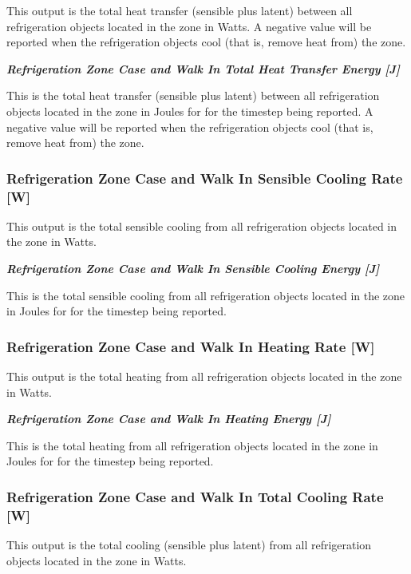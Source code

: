 This output is the total heat transfer (sensible plus latent) between all refrigeration objects located in the zone in Watts. A negative value will be reported when the refrigeration objects cool (that is, remove heat from) the zone.

\textbf{\emph{Refrigeration Zone Case and Walk In Total Heat Transfer Energy {[}J{]}}}

This is the total heat transfer (sensible plus latent) between all refrigeration objects located in the zone in Joules for for the timestep being reported. A negative value will be reported when the refrigeration objects cool (that is, remove heat from) the zone.

\subsubsection{Refrigeration Zone Case and Walk In Sensible Cooling Rate {[}W{]}}\label{refrigeration-zone-case-and-walk-in-sensible-cooling-rate-w}

This output is the total sensible cooling from all refrigeration objects located in the zone in Watts.

\textbf{\emph{Refrigeration Zone Case and Walk In Sensible Cooling Energy {[}J{]}}}

This is the total sensible cooling from all refrigeration objects located in the zone in Joules for for the timestep being reported.

\subsubsection{Refrigeration Zone Case and Walk In Heating Rate {[}W{]}}\label{refrigeration-zone-case-and-walk-in-heating-rate-w}

This output is the total heating from all refrigeration objects located in the zone in Watts.

\textbf{\emph{Refrigeration Zone Case and Walk In Heating Energy {[}J{]}}}

This is the total heating from all refrigeration objects located in the zone in Joules for for the timestep being reported.

\subsubsection{Refrigeration Zone Case and Walk In Total Cooling Rate {[}W{]}}\label{refrigeration-zone-case-and-walk-in-total-cooling-rate-w}

This output is the total cooling (sensible plus latent) from all refrigeration objects located in the zone in Watts.

